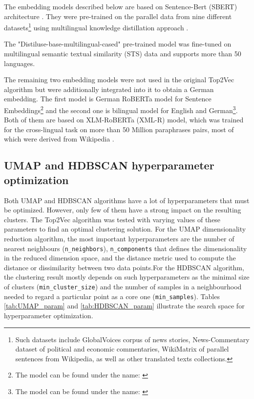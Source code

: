 \documentclass[fontsize=12pt,a4paper,twoside,openany]{scrbook}
\begin{document}
The embedding models described below are based on Sentence-Bert (SBERT) architecture \parencite{Reimers19}. They were pre-trained on the parallel data from nine different datasets\footnote{Such datasets include GlobalVoices corpus of news stories, News-Commentary dataset of political and economic commentaries, WikiMatrix of parallel sentences from Wikipedia, as well as other translated texts collections.} using multilingual knowledge distillation approach \parencite{Reimers20}. 

The "Distiluse-base-multilingual-cased" pre-trained model was fine-tuned on multilingual semantic textual similarity (STS) data and supports more than 50 languages. 

The remaining two embedding models were not used in the original Top2Vec algorithm but were additionally integrated into it to obtain a German embedding. The first model is German RoBERTa model for Sentence Embeddings\footnote{The model can be found under the name: \href{https://huggingface.co/T-Systems-onsite/german-roberta-sentence-transformer-v2}{}} and the second one is bilingual model for English and German\footnote{The model can be found under the name: \href{https://huggingface.co/T-Systems-onsite/cross-en-de-roberta-sentence-transformer}{}}. Both of them are based on XLM-RoBERTa (XML-R) model, which was trained for the cross-lingual task on more than 50 Million paraphrases pairs, most of which were derived from Wikipedia \parencite{Reimers20}.

\subsection{UMAP and HDBSCAN hyperparameter optimization}
\label{sec:hypeparam}

Both UMAP and HDBSCAN algorithms have a lot of hyperparameters that must be optimized. However, only few of them have a strong impact on the resulting clusters. The Top2Vec algorithm was tested with varying values of these parameters to find an optimal clustering solution. For the UMAP dimensionality reduction algorithm, the most important hyperparameters are the number of nearest neighbours (\verb|n_neighbors|), \verb|n_components| that defines the dimensionality in the reduced dimension space, and the distance metric used to compute the distance or dissimilarity between two data points.For the HDBSCAN algorithm, the clustering result mostly depends on such hyperparameters as the minimal size of clusters (\verb|min_cluster_size|) and the number of samples in a neighbourhood needed to regard a particular point as a core one (\verb|min_samples|). Tables \ref{tab:UMAP_param} and \ref{tab:HDBSCAN_param} illustrate the search space for hyperparameter optimization. 
\end{document}
